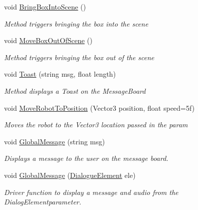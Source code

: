\begin{DoxyCompactItemize}
void \mbox{\hyperlink{class_intro_session_manager_a7f844de6716bc367d539bd3a0dd835de}{Bring\+Box\+Into\+Scene}} ()
\begin{DoxyCompactList}\small\item\em Method triggers bringing the box into the scene \end{DoxyCompactList}\item 
void \mbox{\hyperlink{class_intro_session_manager_a238203538188c1c9407b816adae6487b}{Move\+Box\+Out\+Of\+Scene}} ()
\begin{DoxyCompactList}\small\item\em Method triggers bringing the box out of the scene \end{DoxyCompactList}\item 
void \mbox{\hyperlink{class_intro_session_manager_a158dbb9e63a362ad1f71380ad1f116db}{Toast}} (string msg, float length)
\begin{DoxyCompactList}\small\item\em Method displays a Toast on the Message\+Board \end{DoxyCompactList}\item 
void \mbox{\hyperlink{class_intro_session_manager_a6b31e91f5f7fb8d55555424b3f795750}{Move\+Robot\+To\+Position}} (Vector3 position, float speed=5f)
\begin{DoxyCompactList}\small\item\em Moves the robot to the Vector3 location passed in the param \end{DoxyCompactList}\item 
void \mbox{\hyperlink{class_intro_session_manager_a8e0deb467e6dbfcc9074221bfba81053}{Global\+Message}} (string msg)
\begin{DoxyCompactList}\small\item\em Displays a message to the user on the message board. \end{DoxyCompactList}\item 
void \mbox{\hyperlink{class_intro_session_manager_a97e1107140022bb06bfef6e4054ae69c}{Global\+Message}} (\mbox{\hyperlink{class_dialogue_element}{Dialogue\+Element}} ele)
\begin{DoxyCompactList}\small\item\em Driver function to display a message and audio from the {\ttfamily Dialog\+Element{\ttfamily  parameter. }}


\end{DoxyCompactList}
\end{DoxyCompactItemize}
